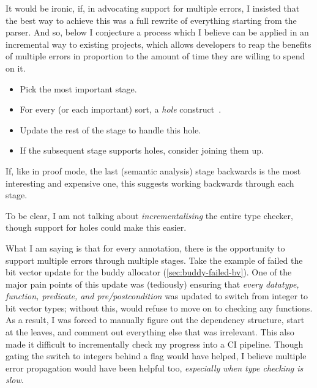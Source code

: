 It would be ironic, if, in advocating support for multiple errors, I insisted
that the best way to achieve this was a full rewrite of everything starting
from the parser. And so, below I conjecture a process which I believe can be
applied in an incremental way to existing projects, which allows developers
to reap the benefits of multiple errors in proportion to the amount of
time they are willing to spend on it.
\begin{itemize}
    \item Pick the most important stage.
    \item For every (or each important) sort, a \emph{hole}
        construct~.
    \item Update the rest of the stage to handle this hole.
    \item If the subsequent stage supports holes, consider joining them up.
\end{itemize}
If, like in  proof mode, the last (semantic analysis) stage backwards is
the most interesting and expensive one, this suggests working backwards through
each stage.

To be clear, I am not talking about \emph{incrementalising} the entire type
checker, though support for holes could make this easier.

What I am saying is that for every  annotation, there is the opportunity
to support multiple errors through multiple stages. Take the example of failed
the bit vector update for the buddy allocator (\cref{sec:buddy-failed-bv}). One
of the major pain points of this update was (tediously) ensuring that
\emph{every datatype, function, predicate, and pre/postcondition} was updated
to switch from integer to bit vector types; without this,  would refuse
to move on to checking any functions. As a result, I was forced to manually
figure out the dependency structure, start at the leaves, and comment out
everything else that was irrelevant. This also made it difficult to
incrementally check my progress into a CI pipeline. Though gating the switch to
integers behind a flag would have helped, I believe multiple error propagation
would have been helpful too, \emph{especially when type checking is slow}.

